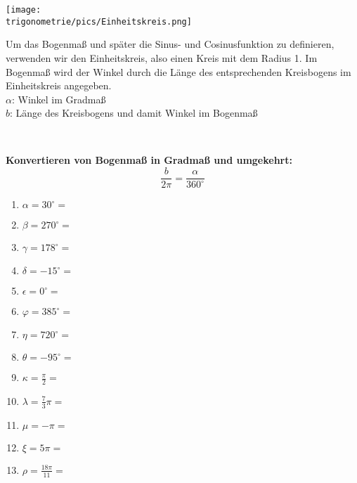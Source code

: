 \begin{minipage}{\textwidth}
	\begin{minipage}{.5\textwidth}
		\texttt{[image: \\trigonometrie/pics/Einheitskreis.png]}
	\end{minipage}
	\begin{minipage}{.5\textwidth}\raggedright
		Um das Bogenmaß und später die Sinus- und Cosinusfunktion zu definieren, verwenden wir den Einheitskreis, also einen Kreis mit dem Radius 1.
		Im Bogenmaß wird der Winkel durch die Länge des entsprechenden Kreisbogens im Einheitskreis angegeben.\\		
		\textcolor{loes}{\(\alpha\): Winkel im Gradmaß}\\
		\textcolor{loes}{\(b\): Länge des Kreisbogens und damit Winkel im Bogenmaß}
	\end{minipage}
\end{minipage}\\
\begin{tcolorbox}
	\textbf{Konvertieren von Bogenmaß in Gradmaß und umgekehrt:}
	\textcolor{loestc}{\[\frac{b}{2\pi}=\frac{\alpha}{360^\circ}\]
	}
\end{tcolorbox}


\begin{Exercise}[title={\raggedright\normalfont Bestimme jeweils das Grad- bzw. Bogenmaß.}, label=bogenmassA1]
	\begin{enumerate}[label=\alph*)]
		\item \(\alpha=30^\circ=\)
		\item \(\beta=270^\circ=\)
		\item \(\gamma=178^\circ=\)
		\item \(\delta=-15^\circ=\)
		\item \(\epsilon=0^\circ=\)
		\item \(\varphi=385^\circ=\)
		\item \(\eta=720^\circ=\)
		\item \(\theta=-95^\circ=\)
		\item \(\kappa=\frac{\pi}{2}=\)
		\item \(\lambda=\frac{7}{3}\pi=\)
		\item \(\mu=-\pi=\)
		\item \(\xi=5\pi=\)
		\item \(\rho=\frac{18\pi}{11}=\)	
	\end{enumerate}
\end{Exercise}



